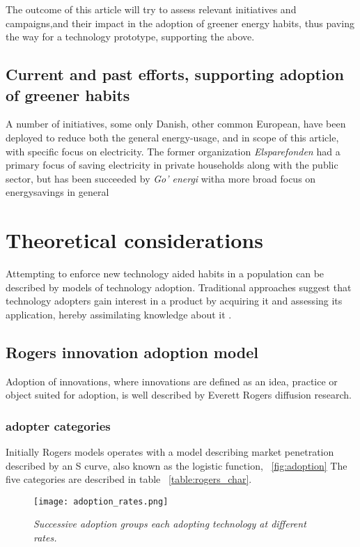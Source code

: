 \documentclass[journal]{IEEEtran}
\begin{document}
The outcome of this article will try to assess relevant initiatives and campaigns,and their impact in the adoption of greener energy habits, thus paving the way for a technology prototype, supporting the above.

\subsection{Current and past efforts, supporting adoption of greener habits}
A number of initiatives, some only Danish, other common European, have been deployed to reduce both the general energy-usage, and in scope of this article, with specific focus on electricity. The former organization \textit{Elsparefonden} had a primary focus of saving electricity in private households along with the public sector, but has been succeeded by \textit{Go' energi} witha more broad focus on energysavings in general \cite{ing_elspar} 

\section{Theoretical considerations}
Attempting to enforce new technology aided habits in a population can be described by models of technology adoption. 
Traditional approaches suggest that technology adopters gain interest in a product by acquiring it and assessing its application, hereby assimilating knowledge about it \cite{gilbert}.

\subsection{Rogers innovation adoption model}
Adoption of innovations, where innovations are defined as an idea, practice or object suited for adoption, is well described by Everett Rogers diffusion research.

\subsubsection{adopter categories}
Initially Rogers models \cite{rogers_model} operates with a model describing market penetration described by an S curve, also known as the logistic function, ~\ref{fig:adoption}
The five categories are described in table ~\ref{table:rogers_char}. \newline

\begin{figure}
\texttt{[image: adoption\_rates.png]}
\caption{\textit{Successive adoption groups each adopting technology at different rates.}}			
\end{figure}
\label{fig:adoption} %
\end{document}
